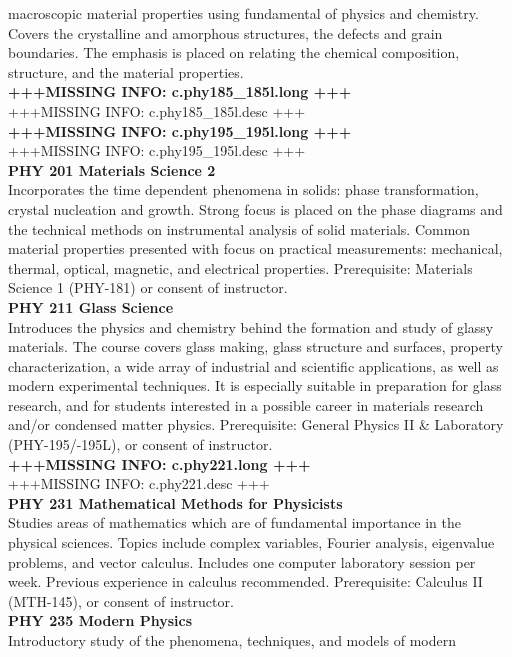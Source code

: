 \documentclass[
  letterpaper,
]{scrbook}
\begin{document}
macroscopic material properties using fundamental of physics and
chemistry. Covers the crystalline and amorphous structures, the defects
and grain boundaries. The emphasis is placed on relating the chemical
composition, structure, and the material properties.\\
\textbf{+++MISSING INFO: c.phy185\_185l.long +++}\\
+++MISSING INFO: c.phy185\_185l.desc +++\\
\textbf{+++MISSING INFO: c.phy195\_195l.long +++}\\
+++MISSING INFO: c.phy195\_195l.desc +++\\
\textbf{PHY 201 Materials Science 2}\\
Incorporates the time dependent phenomena in solids: phase
transformation, crystal nucleation and growth. Strong focus is placed on
the phase diagrams and the technical methods on instrumental analysis of
solid materials. Common material properties presented with focus on
practical measurements: mechanical, thermal, optical, magnetic, and
electrical properties. Prerequisite: Materials Science 1 (PHY-181) or
consent of instructor.\\
\textbf{PHY 211 Glass Science}\\
Introduces the physics and chemistry behind the formation and study of
glassy materials. The course covers glass making, glass structure and
surfaces, property characterization, a wide array of industrial and
scientific applications, as well as modern experimental techniques. It
is especially suitable in preparation for glass research, and for
students interested in a possible career in materials research and/or
condensed matter physics. Prerequisite: General Physics II \& Laboratory
(PHY-195/-195L), or consent of instructor.\\
\textbf{+++MISSING INFO: c.phy221.long +++}\\
+++MISSING INFO: c.phy221.desc +++\\
\textbf{PHY 231 Mathematical Methods for Physicists}\\
Studies areas of mathematics which are of fundamental importance in the
physical sciences. Topics include complex variables, Fourier analysis,
eigenvalue problems, and vector calculus. Includes one computer
laboratory session per week. Previous experience in calculus
recommended. Prerequisite: Calculus II (MTH-145), or consent of
instructor.\\
\textbf{PHY 235 Modern Physics}\\
Introductory study of the phenomena, techniques, and models of modern
\end{document}
